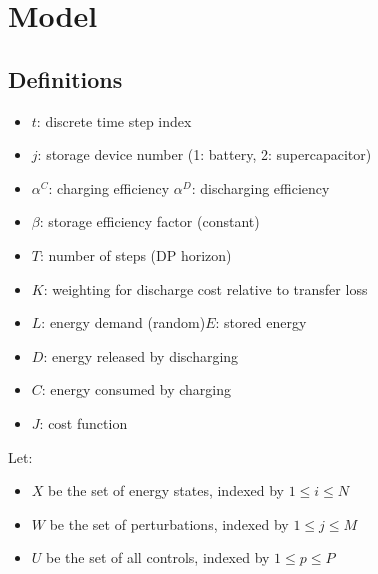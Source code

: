 \documentclass[conference]{IEEEtran}
\begin{document}
\section{Model}

\subsection{Definitions}
\begin{itemize}
	\item $t$: discrete time step index
	\item $j$: storage device number (1: battery, 2: supercapacitor)
	\item $\alpha^{C}$: charging efficiency\hspace{1em}
	$\alpha^{D}$: discharging efficiency
	\item $\beta$: storage efficiency factor (constant)
	\item $T$: number of steps (DP horizon)
	\item $K$: weighting for discharge cost relative to transfer loss
	\item $L$: energy demand (random)\hspace{1em}$E$: stored energy
	\item $D$: energy released by discharging
	\item $C$: energy consumed by charging
	\item $J$: cost function
\end{itemize}

Let:
\begin{itemize}
	\item $X$ be the set of energy states, indexed by $1\leq i \leq N$
	\item $W$ be the set of perturbations, indexed by $1\leq j \leq M$
	\item $U$ be the set of all controls, indexed by $1\leq p \leq P$
\end{itemize}
\end{document}
